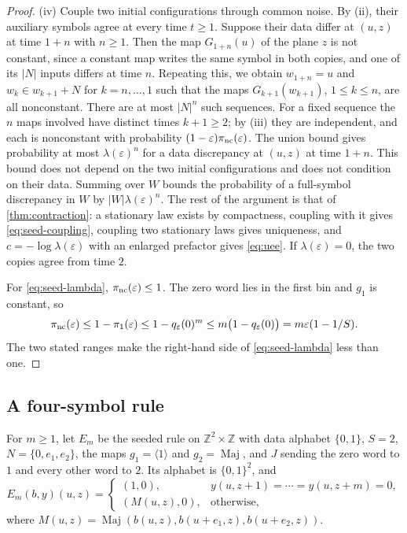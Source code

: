 \documentclass[11pt]{article}
\theoremstyle{plain}
\theoremstyle{definition}
\theoremstyle{remark}
\newcommand{\Z}{\mathbb Z}
\newcommand{\eps}{\varepsilon}
\newcommand{\Maj}{\operatorname{Maj}}
\begin{document}
\begin{proof}
(iv) Couple two initial configurations through common noise. By (ii), their auxiliary symbols agree at every time $t\geq1$. Suppose their data differ at $(u,z)$ at time $1+n$ with $n\geq1$. Then the map $G_{1+n}(u)$ of the plane $z$ is not constant, since a constant map writes the same symbol in both copies, and one of its $|N|$ inputs differs at time $n$. Repeating this, we obtain $w_{1+n}=u$ and $w_k\in w_{k+1}+N$ for $k=n,\ldots,1$ such that the maps $G_{k+1}(w_{k+1})$, $1\leq k\leq n$, are all nonconstant. There are at most $|N|^n$ such sequences. For a fixed sequence the $n$ maps involved have distinct times $k+1\geq2$; by (iii) they are independent, and each is nonconstant with probability $(1-\eps)\pi_{\rm nc}(\eps)$. The union bound gives probability at most $\lambda(\eps)^n$ for a data discrepancy at $(u,z)$ at time $1+n$. This bound does not depend on the two initial configurations and does not condition on their data. Summing over $W$ bounds the probability of a full-symbol discrepancy in $W$ by $|W|\lambda(\eps)^n$. The rest of the argument is that of \cref{thm:contraction}: a stationary law exists by compactness, coupling with it gives \eqref{eq:seed-coupling}, coupling two stationary laws gives uniqueness, and $c=-\log\lambda(\eps)$ with an enlarged prefactor gives \eqref{eq:uee}. If $\lambda(\eps)=0$, the two copies agree from time $2$.

For \eqref{eq:seed-lambda}, $\pi_{\rm nc}(\eps)\leq1$. The zero word lies in the first bin and $g_1$ is constant, so
\[
 \pi_{\rm nc}(\eps)\leq1-\pi_1(\eps)\leq1-q_\eps(0)^m\leq m\bigl(1-q_\eps(0)\bigr)=m\eps(1-1/S).
\]
The two stated ranges make the right-hand side of \eqref{eq:seed-lambda} less than one.
\end{proof}

\subsection{A four-symbol rule}

For $m\geq1$, let $E_m$ be the seeded rule on $\Z^2\times\Z$ with data alphabet $\{0,1\}$, $S=2$, $N=\{0,e_1,e_2\}$, the maps $g_1=\langle1\rangle$ and $g_2=\Maj$, and $J$ sending the zero word to $1$ and every other word to $2$. Its alphabet is $\{0,1\}^2$, and
\begin{equation}\label{eq:four-symbol}
 E_m(b,y)(u,z)=\begin{cases}
 (1,0),& y(u,z+1)=\cdots=y(u,z+m)=0,\\
 (M(u,z),0),&\text{otherwise,}
 \end{cases}
\end{equation}
where $M(u,z)=\Maj(b(u,z),b(u+e_1,z),b(u+e_2,z))$.
\end{document}
